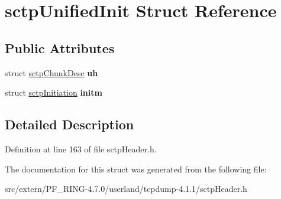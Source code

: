 \hypertarget{structsctp_unified_init}{
\section{sctpUnifiedInit Struct Reference}
\label{structsctp_unified_init}
}
\subsection*{Public Attributes}
\begin{DoxyCompactItemize}
\item 
\hypertarget{structsctp_unified_init_a73ff23ae6405e49bf9faf8e44cc04db5}{
struct \hyperlink{structsctp_chunk_desc}{sctpChunkDesc} {\bfseries uh}}
\label{structsctp_unified_init_a73ff23ae6405e49bf9faf8e44cc04db5}

\item 
\hypertarget{structsctp_unified_init_adbcd88e7ae1b5f52c3c302cab02ab3e9}{
struct \hyperlink{structsctp_initiation}{sctpInitiation} {\bfseries initm}}
\label{structsctp_unified_init_adbcd88e7ae1b5f52c3c302cab02ab3e9}

\end{DoxyCompactItemize}


\subsection{Detailed Description}


Definition at line 163 of file sctpHeader.h.



The documentation for this struct was generated from the following file:\begin{DoxyCompactItemize}
\item 
src/extern/PF\_\-RING-\/4.7.0/userland/tcpdump-\/4.1.1/sctpHeader.h\end{DoxyCompactItemize}
